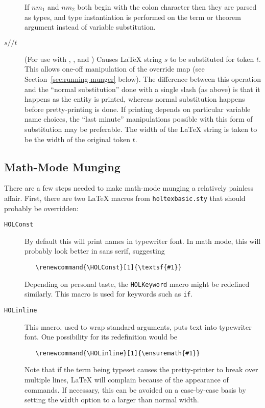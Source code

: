 \begin{description}
If $\mathit{nm}_1$ and $\mathit{nm}_2$ both begin with the colon character then they are parsed as types, and type instantiation is performed on the term or theorem argument instead of variable substitution.

\item[$s\mathtt{//}t$] (For use with \holtm{}, \holthm, and \holty) Causes \LaTeX{} string $s$ to be substituted for token $t$.
This allows one-off manipulation of the override map (see Section~\ref{sec:running-munger} below).
The difference between this operation and the ``normal substitution'' done with a single slash (as above) is that it happens as the \HOL{} entity is printed, whereas normal substitution happens before pretty-printing is done.
If printing depends on particular variable name choices, the ``last minute'' manipulations possible with this form of substitution may be preferable.
The width of the \LaTeX{} string is taken to be the width of the original token $t$.
\end{description}

\subsection{Math-Mode Munging}
\label{sec:math-mode-munging}

There are a few steps needed to make math-mode munging a relatively painless affair.
First, there are two \LaTeX{} macros from \texttt{holtexbasic.sty} that should probably be overridden:
\begin{description}
\item[\texttt{\bs{}HOLConst}] By default this will print names in typewriter font.
In math mode, this will probably look better in sans serif, suggesting
\begin{verbatim}
   \renewcommand{\HOLConst}[1]{\textsf{#1}}
\end{verbatim}
Depending on personal taste, the \texttt{\bs{}HOLKeyword} macro might be redefined similarly.
This macro is used for keywords such as \texttt{if}.
\item[\texttt{\bs{}HOLinline}] This macro, used to wrap standard \texttt{\holtm} arguments, puts text into typewriter font.
One possibility for its redefinition would be
\begin{verbatim}
   \renewcommand{\HOLinline}[1]{\ensuremath{#1}}
\end{verbatim}
Note that if the term being typeset causes the pretty-printer to break over multiple lines, \LaTeX{} will complain because of the appearance of \texttt{\bs\bs} commands.
If necessary, this can be avoided on a case-by-case basis by setting the \texttt{width} option to a larger than normal width.
\end{description}

